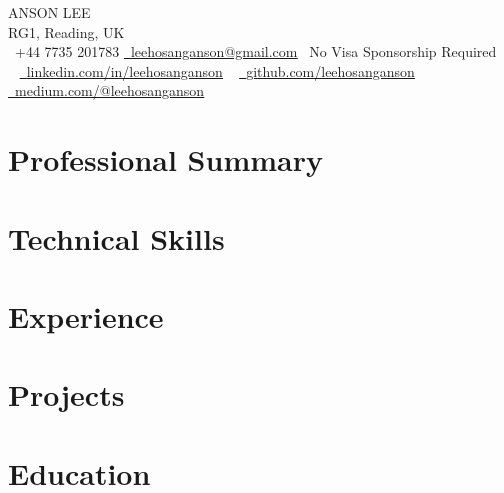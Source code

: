 



\begin{center}
    {\large \scshape ANSON LEE}
    \\
    RG1, Reading, UK
    \\
    \small \faPhone\ +44 7735 201783
    \hspace{0.5em} \href{mailto:leehosanganson@gmail.com}{\faEnvelope\  \underline{leehosanganson@gmail.com}} 
    \hspace{0.5em} \faCheckCircle\ No Visa Sponsorship Required 
    \\
    ~ \href{https://www.linkedin.com/in/leehosanganson}{\faLinkedin\ \underline{linkedin.com/in/leehosanganson}}
    ~ \href{https://github.com/leehosanganson}{\raisebox{-0.2\height}\faGithub\ \underline{github.com/leehosanganson}}
    ~ \href{https://medium.com/@leehosanganson}{\faMedium\ \underline{medium.com/@leehosanganson}}
\end{center}
\vspace{-15pt}

\section{Professional Summary}

\vspace{-8pt}

\section{Technical Skills}

\vspace{-15pt}

\section{Experience}

\vspace{-12pt}

\section{Projects}
\vspace{-8pt}


\section{Education}



